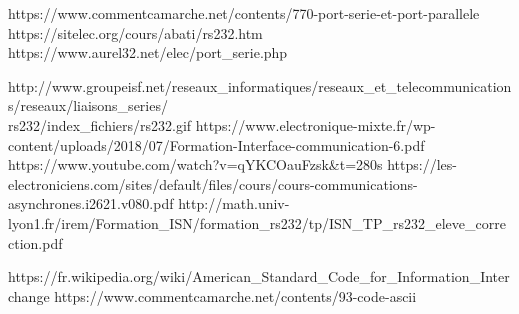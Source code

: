 \documentclass[a4paper]{article}
\begin{document}
\newpage \tableofcontents \listoffigures
\begin{thebibliography}{9}

 https://www.commentcamarche.net/contents/770-port-serie-et-port-parallele
 https://sitelec.org/cours/abati/rs232.htm
 https://www.aurel32.net/elec/port\_serie.php

 http://www.groupeisf.net/reseaux\_informatiques/reseaux\_et\_telecommunications/reseaux/liaisons\_series/\\
rs232/index\_fichiers/rs232.gif
 https://www.electronique-mixte.fr/wp-content/uploads/2018/07/Formation-Interface-communication-6.pdf
 https://www.youtube.com/watch?v=qYKCOauFzsk\&t=280s
 https://les-electroniciens.com/sites/default/files/cours/cours-communications-asynchrones.i2621.v080.pdf
 http://math.univ-lyon1.fr/irem/Formation\_ISN/formation\_rs232/tp/ISN\_TP\_rs232\_eleve\_correction.pdf

 https://fr.wikipedia.org/wiki/American\_Standard\_Code\_for\_Information\_Interchange
 https://www.commentcamarche.net/contents/93-code-ascii
\end{thebibliography}
\end{document}
